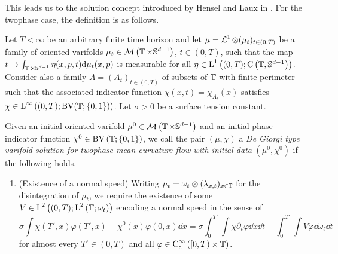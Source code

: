This leads us to the solution concept introduced by Hensel and Laux in 
\cite{hensel_laux_varifold_solution_concept_for_mean_curvature_flow}.
For the twophase case, the definition is as follows.

\begin{definition}
	Let $ T < \infty $ be an arbitrary finite time horizon and let $ \mu = 
	\operatorname{\mathcal{L}}^{ 1 } \otimes ( \mu_{ t } )_{ t \in ( 0 , T ) } $ be a 
	family of oriented varifolds $ \mu_{ t } \in \mathcal{ M } \left( 
	\operatorname{\mathbb{T}} \times \mathbb{ S }^{ d - 1 } \right) $, $ t \in ( 0 , T ) 
	$, such that the map $ t \mapsto \int_{ \operatorname{\mathbb{T}} \times \mathbb{ S }^{ d 
	-1 } } \eta ( x , p , t ) \dd \mu_{ t } ( x , p ) $ is measurable for all 
	$ \eta \in \operatorname{L}^{ 1 } \left( ( 0 , T ) ; \operatorname{C} \left( \operatorname{\mathbb{T}}, 
	\mathbb{ S 
	}^{ d - 1 } \right) \right) $. 
	Consider also a family $ A = ( A_{ t } )_{ t \in ( 0 , T ) } $ of 
	subsets of $ \operatorname{\mathbb{T}} $ with finite perimeter such that the associated 
	indicator function $ \chi ( x , t ) = \chi_{ A _{ t } } ( x ) $ satisfies 
	$ \chi \in \operatorname{L}^{ \infty } \left( ( 0 , T ) ; \operatorname{BV} ( \operatorname{\mathbb{T}} ; \{ 0 , 
	1 \} ) \right) $.
	Let $ \sigma > 0 $ be a surface tension constant.
	
	Given an initial oriented varifold 
	$ \mu^{ 0 } \in \mathcal{ M } \left( \operatorname{\mathbb{T}} \times \mathbb{ S }^{ d - 1 
	} \right) $ and an initial phase indicator function $ \chi^{ 0 } \in \operatorname{BV} 
	\left( \operatorname{\mathbb{T}} ; \{ 0 , 1 \} \right)$, we call the pair $ ( \mu , \chi ) 
	$ a \emph{De Giorgi type varifold solution for twophase mean curvature flow 
	with initial data} $ ( \mu^{ 0 } , \chi^{ 0 } ) $ if the following holds.
	\begin{enumerate}
		\item (Existence of a normal speed)
		Writing $ \mu_{ t } = \omega_{ t } \otimes ( \lambda_{ x , t } )_{ x 
		\in \operatorname{\mathbb{T}}} $ for the disintegration of $ \mu_{ t } $, we require 
		the existence of some 
		$ V \in \operatorname{L}^{ 2 } \left( ( 0 , T ) ; \operatorname{L}^{ 2 } \left( \operatorname{\mathbb{T}} ; 
		\omega_{ t } \right) \right) $ encoding a normal speed in the sense of
		\begin{equation}
			\label{equation_varifold_velocity}
			\sigma
			\int
				\chi ( T' , x ) \varphi ( T' , x ) 
				-
				\chi^{ 0 } ( x ) \varphi (0,x)
			\dd{ x }
			=
			\sigma
			\int_{ 0 }^{ T' }
				\int
					\chi
					\partial_{ t } \varphi 
				\dd{ x }
			\dd{ t }
			+
			\int_{ 0 }^{ T' }
				\int
					V \varphi 
				\dd{ \omega_{ t } }
			\dd{ t }
		\end{equation}
		for almost every $ T' \in ( 0 , T ) $ and all $ \varphi \in \operatorname{C}_{ 
		\mathrm{c} }^{ \infty } \left( [ 0 , T ) \times \operatorname{\mathbb{T}} \right) 
		$.
		

\end{enumerate}
\end{definition}
